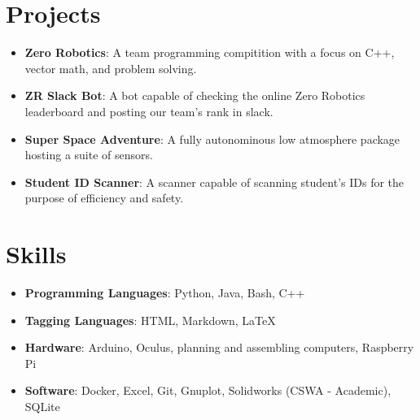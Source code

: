 \documentclass[letterpaper,11pt]{article}
\newcommand{\resumeItem}[2]{
  \item\small{
    \textbf{#1}{: #2 \vspace{-2pt}}
  }
}
\newcommand{\resumeSubItem}[2]{\resumeItem{#1}{#2}\vspace{-4pt}}
\newcommand{\resumeSubHeadingListStart}{\begin{itemize}[leftmargin=*]}
\newcommand{\resumeSubHeadingListEnd}{\end{itemize}}
\begin{document}
\section{Projects}
\resumeSubHeadingListStart
	\resumeSubItem{Zero Robotics}
	{A team programming compitition with a focus on C++, vector math, and problem solving.}
	\resumeSubItem{ZR Slack Bot}
	{A bot capable of checking the online Zero Robotics leaderboard and posting our team's rank in slack.}
	\resumeSubItem{Super Space Adventure}
	{A fully autonominous low atmosphere package hosting a suite of sensors.}
	\resumeSubItem{Student ID Scanner}
	{A scanner capable of scanning student's IDs for the purpose of efficiency and safety.}
\resumeSubHeadingListEnd

\section{Skills}
\resumeSubHeadingListStart
	\item{\textbf{Programming Languages}{: Python, Java, Bash, C++}}
	\item{\textbf{Tagging Languages}{: HTML, Markdown, \LaTeX}}
	\item{\textbf{Hardware}{: Arduino, Oculus, planning and assembling computers, Raspberry Pi}}
	\item{\textbf{Software}{: Docker, Excel, Git, Gnuplot, Solidworks (CSWA - Academic), SQLite}}
\resumeSubHeadingListEnd

\end{document}
